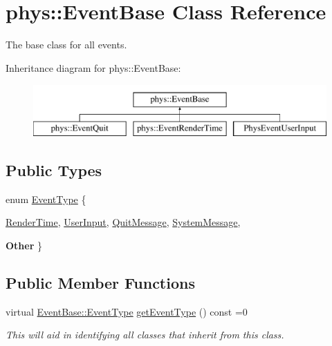 \hypertarget{classphys_1_1EventBase}{
\section{phys::EventBase Class Reference}
\label{dd/d80/classphys_1_1EventBase}
}


The base class for all events.  


Inheritance diagram for phys::EventBase:\begin{figure}[H]
\begin{center}
\leavevmode
\includegraphics[height=2cm]{dd/d80/classphys_1_1EventBase}
\end{center}
\end{figure}
\subsection*{Public Types}
\begin{DoxyCompactItemize}
\item 
enum \hyperlink{classphys_1_1EventBase_a5e6a8564e127f654123f0bf6a2751923}{EventType} \{ \par
\hyperlink{classphys_1_1EventBase_a5e6a8564e127f654123f0bf6a2751923acdfa47d279e8a1c460d557d14b85c7a5}{RenderTime}, 
\hyperlink{classphys_1_1EventBase_a5e6a8564e127f654123f0bf6a2751923a320cc0817dc2c2201501b12c50c89bef}{UserInput}, 
\hyperlink{classphys_1_1EventBase_a5e6a8564e127f654123f0bf6a2751923a84742ff55e9abdde8f5e0578d30f73a9}{QuitMessage}, 
\hyperlink{classphys_1_1EventBase_a5e6a8564e127f654123f0bf6a2751923a18594400c60af959158e9f5cc2cd5d08}{SystemMessage}, 
\par
{\bfseries Other}
 \}
\end{DoxyCompactItemize}
\subsection*{Public Member Functions}
\begin{DoxyCompactItemize}
\item 
virtual \hyperlink{classphys_1_1EventBase_a5e6a8564e127f654123f0bf6a2751923}{EventBase::EventType} \hyperlink{classphys_1_1EventBase_a0f39a25f4b64f7cf701e174454616366}{getEventType} () const =0
\begin{DoxyCompactList}\small\item\em This will aid in identifying all classes that inherit from this class. \item\end{DoxyCompactList}\end{DoxyCompactItemize}



